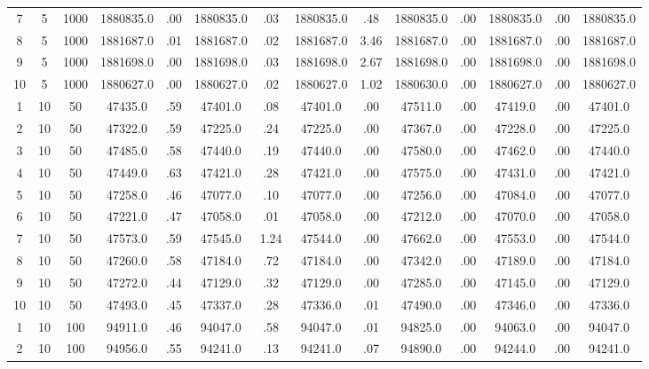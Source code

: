 \documentclass[12pt,a4paper]{article}
\begin{document}
\begin{center}
{\begin{tabular}{|ccc|cc|cc|cc|cc|cc|c|}
7             &   5&1000&1880835.0&  .00&1880835.0&  .03&1880835.0&  .48&1880835.0&  .00&1880835.0&  .00&1880835.0\\[-0.01in]
8             &   5&1000&1881687.0&  .01&1881687.0&  .02&1881687.0& 3.46&1881687.0&  .00&1881687.0&  .00&1881687.0\\[-0.01in]
9             &   5&1000&1881698.0&  .00&1881698.0&  .03&1881698.0& 2.67&1881698.0&  .00&1881698.0&  .00&1881698.0\\[-0.01in]
10            &   5&1000&1880627.0&  .00&1880627.0&  .02&1880627.0& 1.02&1880630.0&  .00&1880627.0&  .00&1880627.0\\[-0.01in]
1             &  10&  50&  47435.0&  .59&  47401.0&  .08&  47401.0&  .00&  47511.0&  .00&  47419.0&  .00&  47401.0\\[-0.01in]
2             &  10&  50&  47322.0&  .59&  47225.0&  .24&  47225.0&  .00&  47367.0&  .00&  47228.0&  .00&  47225.0\\[-0.01in]
3             &  10&  50&  47485.0&  .58&  47440.0&  .19&  47440.0&  .00&  47580.0&  .00&  47462.0&  .00&  47440.0\\[-0.01in]
4             &  10&  50&  47449.0&  .63&  47421.0&  .28&  47421.0&  .00&  47575.0&  .00&  47431.0&  .00&  47421.0\\[-0.01in]
5             &  10&  50&  47258.0&  .46&  47077.0&  .10&  47077.0&  .00&  47256.0&  .00&  47084.0&  .00&  47077.0\\[-0.01in]
6             &  10&  50&  47221.0&  .47&  47058.0&  .01&  47058.0&  .00&  47212.0&  .00&  47070.0&  .00&  47058.0\\[-0.01in]
7             &  10&  50&  47573.0&  .59&  47545.0& 1.24&  47544.0&  .00&  47662.0&  .00&  47553.0&  .00&  47544.0\\[-0.01in]
8             &  10&  50&  47260.0&  .58&  47184.0&  .72&  47184.0&  .00&  47342.0&  .00&  47189.0&  .00&  47184.0\\[-0.01in]
9             &  10&  50&  47272.0&  .44&  47129.0&  .32&  47129.0&  .00&  47285.0&  .00&  47145.0&  .00&  47129.0\\[-0.01in]
10            &  10&  50&  47493.0&  .45&  47337.0&  .28&  47336.0&  .01&  47490.0&  .00&  47346.0&  .00&  47336.0\\[-0.01in]
1             &  10& 100&  94911.0&  .46&  94047.0&  .58&  94047.0&  .01&  94825.0&  .00&  94063.0&  .00&  94047.0\\[-0.01in]
2             &  10& 100&  94956.0&  .55&  94241.0&  .13&  94241.0&  .07&  94890.0&  .00&  94244.0&  .00&  94241.0\\[-0.01in]

\end{tabular}}
\end{center}
\end{document}
